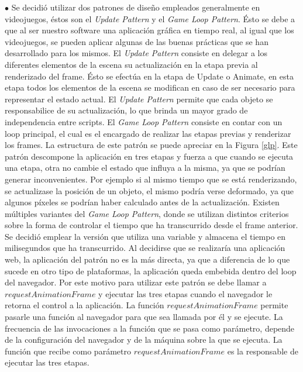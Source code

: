 \documentclass[12pt]{article}
\begin{document}
$\bullet$ Se decidió utilizar dos patrones de diseño empleados generalmente en videojuegos, éstos son el \textit{Update Pattern} y el \textit{Game Loop Pattern}\cite{patterns}\cite{engine}. Ésto se debe a que al ser nuestro software una aplicación gráfica en tiempo real, al igual que los videojuegos, se pueden aplicar algunas de las buenas prácticas que se han desarrollado para los mismos. El \textit{Update Pattern} consiste en delegar a los diferentes elementos de la escena su actualización en la etapa previa al renderizado del frame. Ésto se efectúa en la etapa de Update o Animate, en esta etapa todos los elementos de la escena se modifican en caso de ser necesario para representar el estado actual. El \textit{Update Pattern} permite que cada objeto se responsabilice de su actualización, lo que brinda un mayor grado de independencia entre scripts. El \textit{Game Loop Pattern} consiste en contar con un loop principal, el cual es el encargado de realizar las etapas previas y renderizar los frames.  La estructura de este patrón se puede apreciar en la Figura \ref{glp}. Este patrón descompone la aplicación en tres etapas y fuerza a que cuando se ejecuta una etapa, otra no cambie el estado que influya a la misma, ya que se podrían generar inconvenientes. Por ejemplo si al mismo tiempo que se está renderizando, se actualizase la posición de un objeto, el mismo podría verse deformado, ya que algunos píxeles se podrían haber calculado antes de la actualización. Existen múltiples variantes del \textit{Game Loop Pattern}\cite{patterns}, donde se utilizan distintos criterios sobre la forma de controlar el tiempo que ha transcurrido desde el frame anterior. Se decidió emplear la versión que utiliza una variable y almacena el tiempo en milisegundos que ha transcurrido. Al decidirse que se realizaría una aplicación web, la aplicación del patrón no es la más directa, ya que a diferencia de lo que sucede en otro tipo de plataformas, la aplicación queda embebida dentro del loop del navegador. Por este motivo para utilizar este patrón se debe llamar a $requestAnimationFrame$\cite{patterns} y ejecutar las tres etapas cuando el navegador le retorna el control a la aplicación. La función $requestAnimationFrame$ permite pasarle una función al navegador para que sea llamada por él  y se ejecute. La frecuencia de las invocaciones a la función que se pasa como parámetro, depende de la configuración del navegador y de la máquina sobre la que se ejecuta. La función que recibe como parámetro $requestAnimationFrame$ es la responsable de ejecutar las tres etapas. 
\end{document}

